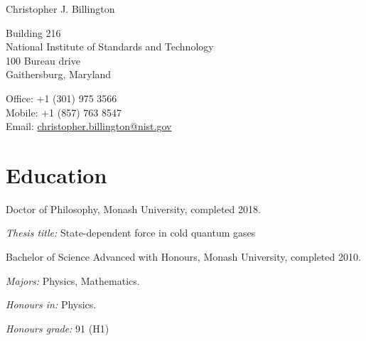 \documentclass[10pt,letterpaper]{article}
\def\name{Christopher J. Billington}
\renewenvironment{itemize}{
  \begin{list}{}{
    \setlength{\leftmargin}{1.5em}
    \setlength{\itemsep}{0.25em}
    \setlength{\parskip}{0pt}
    \setlength{\parsep}{0.25em}
  }
}{
  \end{list}
}
\begin{document}
{\huge \name}

\bigskip

\begin{minipage}[t]{0.5\textwidth}
  Building 216 \\
  National Institute of Standards and Technology \\
  100 Bureau drive \\
  Gaithersburg, Maryland
\end{minipage}
\begin{minipage}[t]{0.5\textwidth}
  Office: +1 (301) 975 3566 \\
  Mobile: +1 (857) 763 8547 \\
  Email: \href{mailto:christopher.billington@nist.gov}{christopher.billington@nist.gov} \\
\end{minipage}

\section*{Education}

\begin{itemize}

  \item Doctor of Philosophy, Monash University, completed 2018.
    \begin{itemize}
    \item \textit{Thesis title:}
      State-dependent force in cold quantum gases
    \end{itemize}
    
  \item Bachelor of Science Advanced with Honours, Monash University, completed 2010.
    \begin{itemize}
    \item \textit{Majors:}
      Physics, Mathematics.
    \item \textit{Honours in:}
      Physics.
    \item \textit{Honours grade:} 91 (\textsc{H}1)
    \end{itemize}
    
  
\end{itemize}
\end{document}
